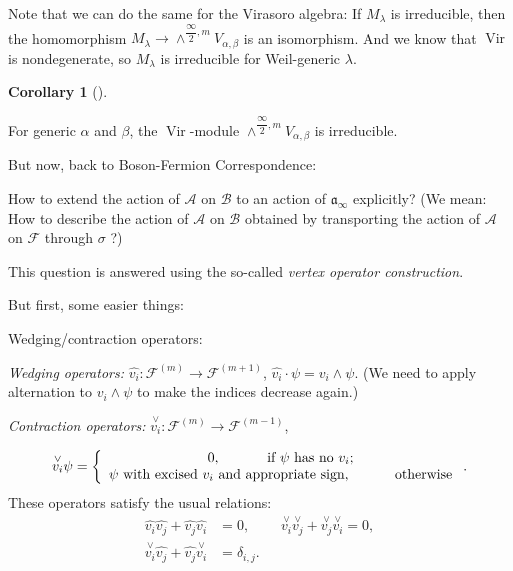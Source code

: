\documentclass
[numbers=enddot,12pt,final,onecolumn,german,notitlepage]{scrartcl}%
\theoremstyle{definition}
\newtheorem{coro}[theo]{Corollary}
\newenvironment{corollary}[1][]
{\begin{coro}[#1]\begin{leftbar}}
{\end{leftbar}\end{coro}}
\begin{document}
Note that we can do the same for the Virasoro algebra: If $M_{\lambda}$ is
irreducible, then the homomorphism $M_{\lambda}\rightarrow\wedge
^{\dfrac{\infty}{2},m}V_{\alpha,\beta}$ is an isomorphism. And we know that
$\operatorname*{Vir}$ is nondegenerate, so $M_{\lambda}$ is irreducible for
Weil-generic $\lambda$.

\begin{corollary}
For generic $\alpha$ and $\beta$, the $\operatorname*{Vir}$-module
$\wedge^{\dfrac{\infty}{2},m}V_{\alpha,\beta}$ is irreducible.
\end{corollary}

But now, back to Boson-Fermion Correspondence:

How to extend the action of $\mathcal{A}$ on $\mathcal{B}$ to an action of
$\mathfrak{a}_{\infty}$ explicitly? (We mean: How to describe the action of
$\mathcal{A}$ on $\mathcal{B}$ obtained by transporting the action of
$\mathcal{A}$ on $\mathcal{F}$ through $\sigma$ ?)

This question is answered using the so-called \textit{vertex operator
construction}.

But first, some easier things:

Wedging/contraction operators:

\textit{Wedging operators: }$\widehat{v_{i}}:\mathcal{F}^{\left(  m\right)
}\rightarrow\mathcal{F}^{\left(  m+1\right)  }$, $\widehat{v_{i}}\cdot
\psi=v_{i}\wedge\psi$. (We need to apply alternation to $v_{i}\wedge\psi$ to
make the indices decrease again.)

\textit{Contraction operators:} $\overset{\vee}{v_{i}}:\mathcal{F}^{\left(
m\right)  }\rightarrow\mathcal{F}^{\left(  m-1\right)  }$,%

\[
\overset{\vee}{v_{i}}\psi=\left\{
\begin{array}
[c]{c}%
0,\ \ \ \ \ \ \ \ \ \ \text{if }\psi\text{ has no }v_{i};\\
\psi\text{ with excised }v_{i}\text{ and appropriate sign,}%
\ \ \ \ \ \ \ \ \ \ \text{otherwise}%
\end{array}
\right.  .
\]
These operators satisfy the usual relations:%
\begin{align*}
\widehat{v_{i}}\widehat{v_{j}}+\widehat{v_{j}}\widehat{v_{i}}  &
=0,\ \ \ \ \ \ \ \ \ \ \overset{\vee}{v_{i}}\overset{\vee}{v_{j}%
}+\overset{\vee}{v_{j}}\overset{\vee}{v_{i}}=0,\\
\overset{\vee}{v_{i}}\widehat{v_{j}}+\widehat{v_{j}}\overset{\vee}{v_{i}}  &
=\delta_{i,j}.
\end{align*}
\end{document}
